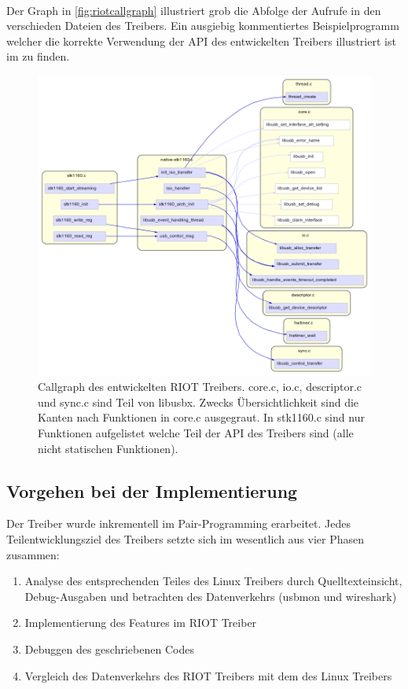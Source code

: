 \paragraph{}
Der Graph in \autoref{fig:riotcallgraph} illustriert grob die Abfolge der Aufrufe in den verschieden Dateien des Treibers. Ein ausgiebig kommentiertes Beispielprogramm welcher die korrekte Verwendung der API des entwickelten Treibers illustriert ist im \projectsrepo{} zu finden.
\begin{figure}[htbp]
 \centering
 \includegraphics[scale=0.63]{./ClusterCallButterflyGraph-native-stk1160-c-highlighted.png}
 \caption{Callgraph des entwickelten RIOT Treibers. core.c, io.c, descriptor.c und sync.c sind Teil von libusbx. Zwecks Übersichtlichkeit sind die Kanten nach Funktionen in core.c ausgegraut. In stk1160.c sind nur Funktionen aufgelistet welche Teil der API des Treibers sind (alle nicht statischen Funktionen).}
 \label{fig:riotcallgraph}
\end{figure}
\restoregeometry
\subsection{Vorgehen bei der Implementierung}
Der Treiber wurde inkrementell im Pair-Programming erarbeitet. Jedes Teilentwicklungsziel des Treibers setzte sich im wesentlich aus vier Phasen zusammen:
\begin{enumerate}
 \item Analyse des entsprechenden Teiles des Linux Treibers durch Quelltexteinsicht, Debug-Ausgaben und betrachten des Datenverkehrs (usbmon und wireshark)
 \item Implementierung des Features im RIOT Treiber
 \item Debuggen des geschriebenen Codes
 \item Vergleich des Datenverkehrs des RIOT Treibers mit dem des Linux Treibers
\end{enumerate}

